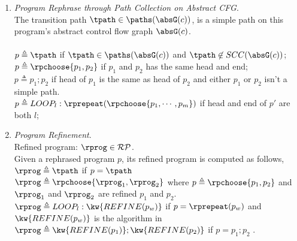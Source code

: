\begin{enumerate}
  \item \emph{Program Rephrase through Path Collection on Abstract CFG}.
  \\
  The transition path
  $\tpath \in \paths(\absG(c))$, is a simple path on this program's abstract control flow graph $\absG(c)$.
  \\
  \\
  $p \triangleq \tpath $ if $\tpath \in \paths(\absG(c))$ and $\tpath \not\in SCC(\absG(c))$;
  \\
  $p \triangleq \rpchoose\{p_1, p_2 \}$ if $p_1$ and $p_2$ has the same head and end;
  \\
  $p \triangleq p_1; p_2$ if head of $p_1$ is the same as head of $p_2$ and either $p_1$ or $p_2$ isn't a simple path. 
  \\
  $p \triangleq LOOP_l : \rprepeat(\rpchoose\{p_1, \cdots, p_m\})$ if head and end of $p'$ are both $l$;
\item \emph{Program Refinement}.
\\
  Refined program:
  $\rprog \in \mathcal{RP}$.
  \\
  Given a rephrased program $p$, its refined program is computed as follows,
  \\
  $\rprog \triangleq \tpath $ if $p = \tpath$\\
  $\rprog \triangleq \rpchoose\{\rprog_1, \rprog_2 \}$ where $p \triangleq \rpchoose\{p_1, p_2 \}$ and 
    $\rprog_1$ and $\rprog_2$ are refined $p_1$ and $p_2$. 
    \\
  $\rprog \triangleq LOOP_l : \kw{REFINE(p_w)}$  if $p = \rprepeat(p_w)$ and  $\kw{REFINE(p_w)}$ is the algorithm in \\
  $\rprog \triangleq \kw{REFINE(p_1)}; \kw{REFINE(p_2)}$  if $p = p_1; p_2$ 
  \cite{sinn2017complexity}.
\end{enumerate}
